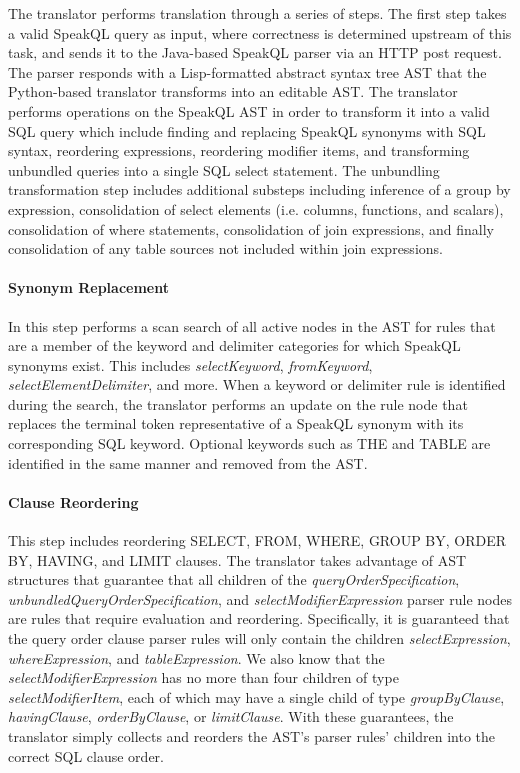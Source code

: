 The translator performs translation through a series of steps. The first step takes a valid SpeakQL query as input, where correctness is determined upstream of this task, and sends it to the Java-based SpeakQL parser via an HTTP post request. The parser responds with a Lisp-formatted abstract syntax tree AST that the Python-based translator transforms into an editable AST. The translator performs operations on the SpeakQL AST in order to transform it into a valid SQL query which include finding and replacing SpeakQL synonyms with SQL syntax, reordering expressions, reordering modifier items, and transforming unbundled queries into a single SQL select statement. The unbundling transformation step includes additional substeps including inference of a group by expression, consolidation of select elements (i.e. columns, functions, and scalars), consolidation of where statements, consolidation of join expressions, and finally consolidation of any table sources not included within join expressions.



\paragraph{\textbf{Synonym Replacement}} 
In this step performs a scan search of all active nodes in the AST for rules that are a member of the keyword and delimiter categories for which SpeakQL synonyms exist. 
This includes \emph{selectKeyword}, \emph{fromKeyword}, \emph{selectElementDelimiter}, and more. 
When a keyword or delimiter rule is identified during the search, the translator performs an update on the rule node that replaces the terminal token representative of a SpeakQL synonym with its corresponding SQL keyword. 
Optional keywords such as THE and TABLE are identified in the same manner and removed from the AST.

\ReplaceSynonymsAlgorithm

\paragraph{\textbf{Clause Reordering}}
This step includes reordering SELECT, FROM, WHERE, GROUP BY, ORDER BY, HAVING, and LIMIT clauses. 
The translator takes advantage of AST structures that guarantee that all children of the \emph{queryOrderSpecification}, \emph{unbundledQueryOrderSpecification}, and \emph{selectModifierExpression} parser rule nodes are rules that require evaluation and reordering. 
Specifically, it is guaranteed that the query order clause parser rules will only contain the children \emph{selectExpression}, \emph{whereExpression}, and \emph{tableExpression}. 
We also know that the \emph{selectModifierExpression} has no more than four children of type \emph{selectModifierItem}, each of which may have a single child of type \emph{groupByClause}, \emph{havingClause}, \emph{orderByClause}, or \emph{limitClause}. 
With these guarantees, the translator simply collects and reorders the AST's parser rules' children into the correct SQL clause order.

